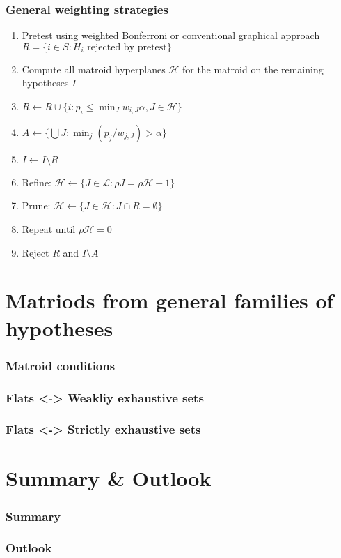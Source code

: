 \documentclass[bigger]{beamer}
\newcommand{\parentd}{../}
\begin{document}
\begin{frame}
\frametitle{General weighting strategies}

\begin{enumerate}
\item Pretest using weighted Bonferroni or conventional graphical
  approach $R = \{i \in S: H_i \textrm{ rejected by pretest}\}$
\item Compute all matroid hyperplanes $\mathscr{H}$ for the matroid on
  the remaining hypotheses $I$
\item $R \gets R \cup \{i: p_i \leq \min_J w_{i,J} \alpha, J \in \mathscr{H}\}$
\item $A \gets \{\bigcup J: \min_j (p_j / w_{j,J}) > \alpha\}$ 
\item $I \gets I \setminus R$
\item Refine: $\mathscr{H} \gets \{J\in \mathscr{L}: \rho J = \rho
  \mathscr{H} - 1\}$ 
\item Prune: $\mathscr{H} \gets \{J \in \mathscr{H}: J \cap R = \emptyset\}$
\item Repeat until $\rho \mathscr {H} = 0$
\item Reject $R$ and $I \setminus A$
\end{enumerate}
\end{frame}
\section{Matriods from general families of hypotheses}



\begin{frame}
\frametitle{Matroid conditions}
\end{frame}



\begin{frame}
\frametitle{Flats <-> Weakliy exhaustive sets}
\end{frame}



\begin{frame}
\frametitle{Flats <-> Strictly exhaustive sets}
\end{frame}
\section{Summary \& Outlook}



\begin{frame}
\frametitle{Summary}
\end{frame}



\begin{frame}
\frametitle{Outlook}

\end{frame}



\end{document}
